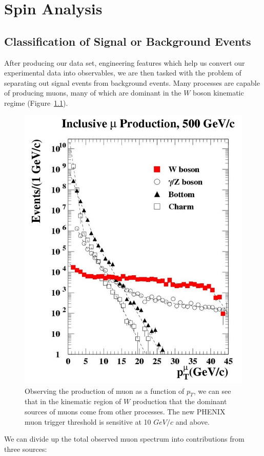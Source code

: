 \chapter{Spin Analysis}
\section{Classification of Signal or Background Events}
After producing our data set, engineering features which help us convert our
experimental data into observables, we are then tasked with the problem of
separating out signal events from background events. Many processes are capable
of producing muons, many of which are dominant in the $W$ boson kinematic
regime (Figure~\ref{fig:muon_production_vs_pt}).

\begin{figure}[H]
\begin{center}
\includegraphics[width=0.75\linewidth]{../Chapter5/fig/muon_production_vs_pt.jpg}
\caption{ Observing the production of muon as a function of $p_T$, we can see
that in the kinematic region of $W$ production that the dominant sources of
muons come from other processes. The new PHENIX muon trigger threshold is
sensitive at 10 $GeV/c$ and above. }
\label{fig:muon_production_vs_pt}
\end{center}
\end{figure}

We can divide up the total observed muon spectrum into contributions from three
sources:

